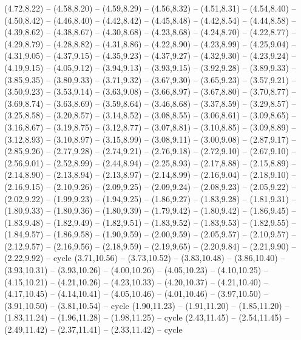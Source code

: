 {(4.72,8.22) -- (4.58,8.20) -- (4.59,8.29) -- (4.56,8.32) -- (4.51,8.31) -- (4.54,8.40) -- (4.50,8.42) -- (4.46,8.40) -- (4.42,8.42) -- (4.45,8.48) -- (4.42,8.54) -- (4.44,8.58) -- (4.39,8.62) -- (4.38,8.67) -- (4.30,8.68) -- (4.23,8.68) -- (4.24,8.70) -- (4.22,8.77) -- (4.29,8.79) -- (4.28,8.82) -- (4.31,8.86) -- (4.22,8.90) -- (4.23,8.99) -- (4.25,9.04) -- (4.31,9.05) -- (4.37,9.15) -- (4.35,9.23) -- (4.37,9.27) -- (4.32,9.30) -- (4.23,9.24) -- (4.19,9.15) -- (4.05,9.12) -- (3.94,9.13) -- (3.93,9.15) -- (3.92,9.28) -- (3.89,9.33) -- (3.85,9.35) -- (3.80,9.33) -- (3.71,9.32) -- (3.67,9.30) -- (3.65,9.23) -- (3.57,9.21) -- (3.50,9.23) -- (3.53,9.14) -- (3.63,9.08) -- (3.66,8.97) -- (3.67,8.80) -- (3.70,8.77) -- (3.69,8.74) -- (3.63,8.69) -- (3.59,8.64) -- (3.46,8.68) -- (3.37,8.59) -- (3.29,8.57) -- (3.25,8.58) -- (3.20,8.57) -- (3.14,8.52) -- (3.08,8.55) -- (3.06,8.61) -- (3.09,8.65) -- (3.16,8.67) -- (3.19,8.75) -- (3.12,8.77) -- (3.07,8.81) -- (3.10,8.85) -- (3.09,8.89) -- (3.12,8.93) -- (3.10,8.97) -- (3.15,8.99) -- (3.08,9.11) -- (3.00,9.08) -- (2.87,9.17) -- (2.85,9.26) -- (2.77,9.28) -- (2.74,9.21) -- (2.76,9.18) -- (2.72,9.10) -- (2.67,9.10) -- (2.56,9.01) -- (2.52,8.99) -- (2.44,8.94) -- (2.25,8.93) -- (2.17,8.88) -- (2.15,8.89) -- (2.14,8.90) -- (2.13,8.94) -- (2.13,8.97) -- (2.14,8.99) -- (2.16,9.04) -- (2.18,9.10) -- (2.16,9.15) -- (2.10,9.26) -- (2.09,9.25) -- (2.09,9.24) -- (2.08,9.23) -- (2.05,9.22) -- (2.02,9.22) -- (1.99,9.23) -- (1.94,9.25) -- (1.86,9.27) -- (1.83,9.28) -- (1.81,9.31) -- (1.80,9.33) -- (1.80,9.36) -- (1.80,9.39) -- (1.79,9.42) -- (1.80,9.42) -- (1.86,9.45) -- (1.83,9.48) -- (1.82,9.49) -- (1.82,9.51) -- (1.83,9.52) -- (1.83,9.53) -- (1.82,9.55) -- (1.84,9.57) -- (1.86,9.58) -- (1.90,9.59) -- (2.00,9.59) -- (2.05,9.57) -- (2.10,9.57) -- (2.12,9.57) -- (2.16,9.56) -- (2.18,9.59) -- (2.19,9.65) -- (2.20,9.84) -- (2.21,9.90) -- (2.22,9.92) -- cycle
  (3.71,10.56) -- (3.73,10.52) -- (3.83,10.48) -- (3.86,10.40) -- (3.93,10.31) -- (3.93,10.26) -- (4.00,10.26) -- (4.05,10.23) -- (4.10,10.25) -- (4.15,10.21) -- (4.21,10.26) -- (4.23,10.33) -- (4.20,10.37) -- (4.21,10.40) -- (4.17,10.45) -- (4.14,10.41) -- (4.05,10.46) -- (4.01,10.46) -- (3.97,10.50) -- (3.91,10.50) -- (3.81,10.54) -- cycle
  (1.90,11.23) -- (1.91,11.20) -- (1.85,11.20) -- (1.83,11.24) -- (1.96,11.28) -- (1.98,11.25) -- cycle
  (2.43,11.45) -- (2.54,11.45) -- (2.49,11.42) -- (2.37,11.41) -- (2.33,11.42) -- cycle}
